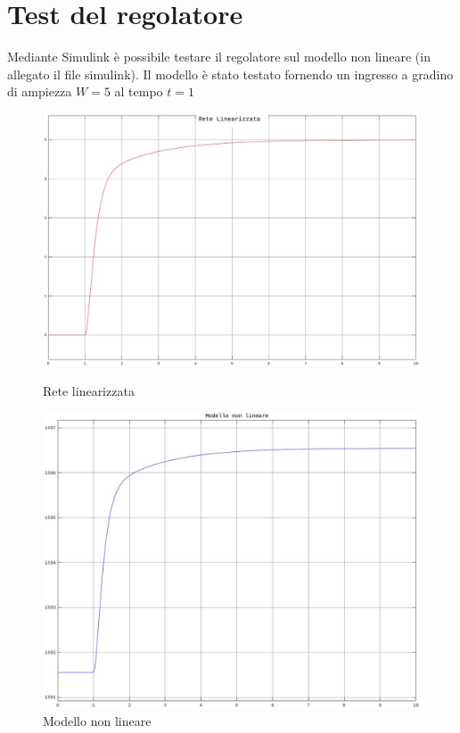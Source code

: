 \documentclass[a4paper,12pt,italian]{article}
\begin{document}
\section{Test del regolatore}

Mediante Simulink è possibile testare il regolatore sul modello non lineare (in allegato il file simulink).
Il modello è stato testato fornendo un ingresso a gradino di ampiezza $W=5$ al tempo $t=1$

\begin{figure}[h!]
    \centering
    \begin{minipage}{0.45\textwidth}
        \centering
        \includegraphics[scale=0.2]{img/modello_lineare.jpg}
        \caption{Rete linearizzata}
    \end{minipage}\hspace{2em}
    \begin{minipage}{0.45\textwidth}
        \centering
        \includegraphics[scale=0.23]{img/modello_non_lineare.jpg}
        \caption{Modello non lineare}
    \end{minipage}
\end{figure}
\end{document}
